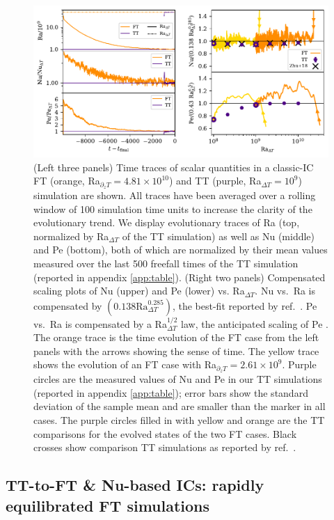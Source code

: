 \documentclass[aps, pre, onecolumn, nofootinbib, notitlepage, groupedaddress, amsfonts, amssymb, amsmath, longbibliography, superscriptaddress]{revtex4-1}
\newcommand{\ea}[1]{{\color{red} #1}}
\begin{document}
\begin{figure}[t!]
\includegraphics[width=\textwidth]{./figs/rbc_scalar_comparisons.pdf}
\caption{ 
	(Left three panels) Time traces of scalar quantities in a classic-IC FT (orange, Ra$_{\partial_z T} = 4.81 \times 10^{10}$) and TT (purple, Ra$_{\Delta T} = 10^9$) simulation are shown.
	All traces have been averaged over a rolling window of 100 \ea{simulation} time units to increase the clarity of the evolutionary trend.
	We display evolutionary traces of Ra (top, normalized by Ra$_{\Delta T}$ of the TT simulation) as well as Nu (middle) and Pe (bottom), both of which are normalized by their mean values measured over the last 500 freefall times of the TT simulation (reported in appendix \ref{app:table}).
	(Right two panels) Compensated scaling plots of Nu (upper) and Pe (lower) vs. Ra$_{\Delta T}$.
	Nu vs.~Ra is compensated by $(0.138 \text{Ra}_{\Delta T}^{0.285})$, the best-fit reported by ref.~\cite{johnston&doering2009}.
	Pe vs.~Ra is compensated by a Ra$_{\Delta T}^{1/2}$ law, the anticipated scaling of Pe \cite{ahlers&all2009}.
	The orange trace is the time evolution of the FT case from the left panels with the arrows showing the sense of time.
	The yellow trace shows the evolution of an FT case with Ra$_{\partial_z T} = 2.61 \times 10^9$.
	Purple circles are the measured values of Nu and Pe in our TT simulations (reported in appendix \ref{app:table}); error bars show the standard deviation of the sample mean and are smaller than the marker in all cases.
	The purple circles filled in with yellow and orange are the TT comparisons for the evolved states of the two FT cases.
	Black crosses show comparison TT simulations as reported by ref.~\cite{zhu&all2018}.
\label{fig:rbc_scalar_comparisons} }
\end{figure}


\newpage
\subsection{TT-to-FT \& Nu-based ICs: rapidly equilibrated FT simulations}
\label{sec:tt-to-ft}
\end{document}
